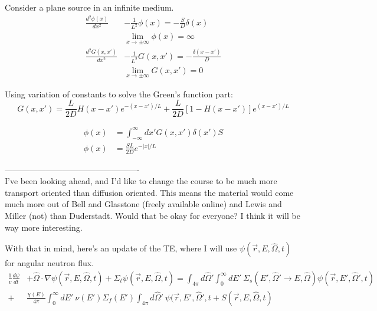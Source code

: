 \documentclass[12pt]{article}
\newcommand{\vOmega}{\ensuremath{\hat{\Omega}}}
\begin{document}
Consider a plane source in an infinite medium.
%
\begin{align*}
\frac{d^2\phi(x)}{dx^2} &- \frac{1}{L^2}\phi(x) = -\frac{S}{D}\delta(x)\\
&\lim\limits_{x\to\pm\infty}\phi(x) = \infty\\
\frac{d^2 G(x,x')}{dx^2} &- \frac{1}{L^2}G(x,x') = -\frac{\delta(x-x')}{D}\\
&\lim\limits_{x\to\pm\infty}G(x,x') = 0
\end{align*}

Using variation of constants to solve the Green's function part:
%
\begin{equation*}
G(x,x') = \frac{L}{2D}H(x-x')e^{-(x-x')/L} + \frac{L}{2D}[1-H(x-x')]e^{(x-x')/L}
\end{equation*}

\begin{align*}
\phi(x) &= \int_{-\infty}^{\infty}dx'G(x,x')\delta(x')S\\
\phi(x) &= \frac{SL}{2D}e^{-|x|/L}
\end{align*}

-------------------------------------------------\\
I've been looking ahead, and I'd like to change the course to be much more transport oriented than diffusion oriented. 
This means the material would come much more out of Bell and Glasstone (freely available online) and Lewis and Miller (not) than Duderstadt. 
Would that be okay for everyone?
I think it will be way more interesting. 

With that in mind, here's an update of the TE, where I will use $\psi(\vec{r}, E, \vOmega, t)$ for angular neutron flux.
%
\begin{align*}
\frac{1}{v} \frac{d \psi}{dt} &+ \vOmega \cdot \nabla \psi(\vec{r}, E, \vOmega, t) + \Sigma_t \psi(\vec{r}, E, \vOmega, t) = \int_{4 \pi} d\vOmega' \int_0^{\infty} dE' \: \Sigma_s(E', \vOmega' \rightarrow E, \vOmega) \psi(\vec{r}, E', \vOmega', t)\\
 +& \frac{\chi(E)}{4 \pi}\int_0^{\infty} dE' \: \nu(E') \Sigma_f(E') \int_{4 \pi} d\vOmega' \:\psi(\vec{r}, E', \vOmega', t + S(\vec{r}, E, \vOmega, t)
\end{align*}
\end{document}
